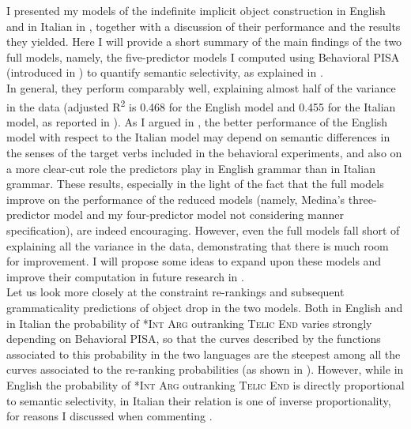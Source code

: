 I presented my models of the indefinite implicit object construction in English and in Italian in , together with a discussion of their performance and the results they yielded. Here I will provide a short summary of the main findings of the two full models, namely, the five-predictor models I computed using Behavioral PISA (introduced in ) to quantify semantic selectivity, as explained in .\\
In general, they perform comparably well, explaining almost half of the variance in the data (adjusted R\textsuperscript{2} is 0.468 for the English model and 0.455 for the Italian model, as reported in ). As I argued in , the better performance of the English model with respect to the Italian model may depend on semantic differences in the senses of the target verbs included in the behavioral experiments, and also on a more clear-cut role the predictors play in English grammar than in Italian grammar. These results, especially in the light of the fact that the full models improve on the performance of the reduced models (namely, Medina's three-predictor model and my four-predictor model not considering manner specification), are indeed encouraging. However, even the full models fall short of explaining all the variance in the data, demonstrating that there is much room for improvement. I will propose some ideas to expand upon these models and improve their computation in future research in .\\
Let us look more closely at the constraint re-rankings and subsequent grammaticality predictions of object drop in the two models. Both in English and in Italian the probability of \textsc{*Int Arg} outranking \textsc{Telic End} varies strongly depending on Behavioral PISA, so that the curves described by the functions associated to this probability in the two languages are the steepest among all the curves associated to the re-ranking probabilities (as shown in ). However, while in English the probability of \textsc{*Int Arg} outranking \textsc{Telic End} is directly proportional to semantic selectivity, in Italian their relation is one of inverse proportionality, for reasons I discussed when commenting .\\
